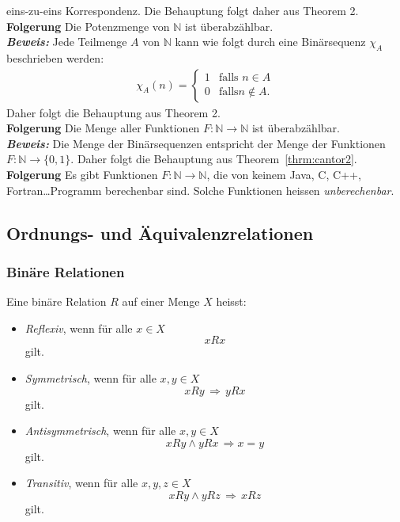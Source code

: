 eins-zu-eins Korrespondenz. Die Behauptung folgt daher aus Theorem 2.\\
\textbf{Folgerung }
Die Potenzmenge von $\mathbb{N}$ ist überabzählbar. \\
\textbf{\textit{Beweis: }}
Jede Teilmenge $A$ von $\mathbb{N}$ kann wie folgt durch eine Binärsequenz $\chi_A$ beschrieben werden:
\begin{align*}
	\chi_A(n)=\begin{cases}
		1 & \text{falls } n\in A    \\
		0 & \text{falls} n\notin A.
	\end{cases}
\end{align*}
Daher folgt die Behauptung aus Theorem 2.\\
\textbf{Folgerung }
Die Menge aller Funktionen $F:\mathbb{N}\to\mathbb{N}$ ist überabzählbar. \\
\textbf{\textit{Beweis: }}
Die Menge der Binärsequenzen entspricht der Menge der Funktionen $F:\mathbb{N}\to\{0,1\}$. Daher folgt die Behauptung
aus Theorem~\ref{thrm:cantor2}. \\
\textbf{Folgerung }
Es gibt Funktionen $F:\mathbb{N}\to\mathbb{N}$, die von keinem Java, C, C++, Fortran\dots Programm berechenbar sind. Solche Funktionen heissen \textit{unberechenbar}.

\subsection{Ordnungs- und Äquivalenzrelationen}%
\label{sub:ordnungs_und_äquivalenzrelationen}

\subsubsection{Binäre Relationen}%
\label{ssub:binäre_relationen}
Eine binäre Relation $R$ auf einer Menge $X$ heisst:
\begin{itemize}
	\item \textit{Reflexiv}, wenn für alle $x\in X$
	      \[
		      xRx
	      \]
	      gilt.
	\item \textit{Symmetrisch}, wenn für alle $x,y\in X$
	      \[
		      xRy\,\Rightarrow\, yRx
	      \]
	      gilt.
	\item \textit{Antisymmetrisch}, wenn für alle $x,y\in X$
	      \[
		      xRy\land yRx\,\Rightarrow x=y
	      \]
	      gilt.
	\item \textit{Transitiv}, wenn für alle $x,y,z\in X$
	      \[
		      xRy\land yRz\,\Rightarrow \, xRz
	      \]
	      gilt.
\end{itemize}
